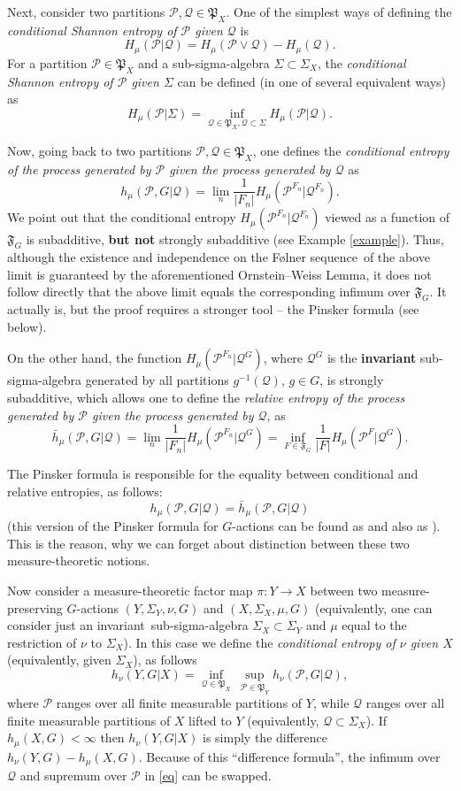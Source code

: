 \documentclass[12pt]{amsart}
\theoremstyle{definition}
\numberwithin{equation}{section}
\newcommand{\GP}{\mathfrak{P}}
\def \Q {\mathcal Q}
\def \P {\mathcal P}
\def \sq {sequence}
\def \inv {invariant}
\def \Q {\mathcal Q}
\def \P {\mathcal P}
\def \sq {sequence}
\def \inv {invariant}
\begin{document}
Next, consider two partitions $\P,\Q\in\GP_X$. One of the simplest ways of defining the \emph{conditional Shannon entropy of $\P$ given $\Q$} is
$$
H_\mu(\P|\Q) = H_\mu(\P\vee\Q)- H_\mu(\Q).
$$
For a partition $\P\in\GP_X$ and a sub-sigma-algebra $\Sigma\subset\Sigma_X$, the \emph{conditional Shannon entropy of $\P$ given $\Sigma$} can be defined (in one of several equivalent ways) as
$$
H_\mu(\P|\Sigma) = \inf_{\Q\in\GP_X, \Q\subset\Sigma} H_\mu(\P|\Q).
$$

Now, going back to two partitions $\P,\Q\in\GP_X$, one defines the \emph{conditional entropy of the process generated by $\P$ given the process generated by $\Q$} as
$$
h_\mu(\P,G|\Q)= \lim_n \frac1{|F_n|}H_\mu(\P^{F_n}|\Q^{F_n}).
$$
We point out that the conditional entropy $H_\mu(\P^{F_n}|\Q^{F_n})$ viewed as a function of $\mathfrak F_G$ is subadditive, {\bf but not} strongly subadditive (see Example \ref{example}).  Thus, although the existence and independence on the F\o lner \sq\ of the above limit is guaranteed by the aforementioned Ornstein--Weiss Lemma, it does not follow directly that the above limit equals the corresponding infimum over $\mathfrak F_G$. It actually is, but the proof requires a stronger tool -- the Pinsker formula (see below).

On the other hand, the function $H_\mu(\P^{F_n}|\Q^G)$, where $\Q^G$ is the {\bf\inv} sub-sigma-algebra generated by all partitions $g^{-1}(\Q)$, $g\in G$, is strongly subadditive, which allows one to define the \emph{relative entropy of the process generated by $\P$ given the process generated by $\Q$}, as
$$
\bar h_\mu(\P,G|\Q)= \lim_n \frac1{|F_n|}H_\mu(\P^{F_n}|\Q^G)=\inf_{F\in\mathfrak F_G}
\frac1{|F|}H_\mu(\P^{F}|\Q^G).
$$

The Pinsker formula is responsible for the equality between conditional and relative entropies, as follows:
$$
h_\mu(\P,G|\Q)= \bar h_\mu(\P,G|\Q)
$$
(this version of the Pinsker formula for $G$-actions can be found as \cite[Theorem 4.4]{WZ} and also as \cite[Lemma 1.1]{GTW}). This is the reason, why we can forget about distinction between these two measure-theoretic notions.

\smallskip
Now consider a measure-theoretic factor map $\pi:Y\to X$ between two measure-preserving $G$-actions $(Y,\Sigma_Y,\nu,G)$ and $(X,\Sigma_X,\mu,G)$ (equivalently, one can consider just an \inv\ sub-sigma-algebra $\Sigma_X\subset\Sigma_Y$ and $\mu$ equal to the restriction of $\nu$ to $\Sigma_X$). In this case we define the \emph{conditional entropy of $\nu$ given $X$} (equivalently, given $\Sigma_X$), as follows
\begin{equation}\label{eq}
h_\nu(Y,G|X)= \inf_{\Q\in\GP_X}\ \sup_{\P\in\GP_Y} h_\nu(\P,G|\Q),
\end{equation}
where $\P$ ranges over all finite measurable partitions of $Y$, while $\Q$ ranges over all finite measurable partitions of $X$ lifted to $Y$ (equivalently, $\Q\subset\Sigma_X$). If $h_\mu(X,G)<\infty$ then $h_\nu(Y,G|X)$ is simply the difference $h_\nu(Y,G)-h_\mu(X,G)$. 
Because of this ``difference formula'', the infimum over $\Q$ and supremum over $\P$ in \eqref{eq} can be swapped.
\smallskip
\end{document}
